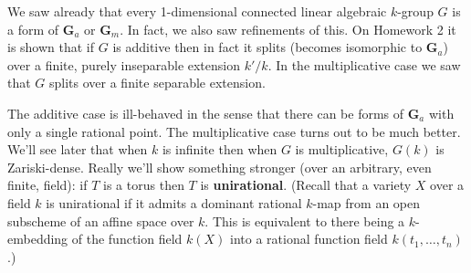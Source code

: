 \documentclass[10pt]{article}
\renewcommand{\(}{\left(}
\renewcommand{\)}{\right)}
\numberwithin{thm}{subsection}
\begin{document}
We saw already that every 1-dimensional connected linear algebraic $k$-group $G$ is a form of $\mathbf{G}_a$ or $\mathbf{G}_m$.
In fact, we also saw refinements of this. On Homework 2
it is shown that if $G$ is additive then in fact it splits
(becomes isomorphic to $\mathbf{G}_a$) over a finite, purely inseparable
extension $k'/k$.
In the multiplicative case we saw that $G$ splits over a finite separable extension.

The additive case is ill-behaved in the sense that there can be forms
of $\mathbf{G}_a$ with only a single rational point.
The multiplicative case turns out to be much better. We'll see later that
when $k$ is infinite then when $G$ is multiplicative, $G(k)$ is Zariski-dense.
Really we'll show something stronger (over an arbitrary, even finite, field):
if $T$ is a torus then $T$ is \textbf{unirational}.
(Recall that a variety $X$ over a field $k$ is unirational if it admits a dominant rational 
$k$-map from an open subscheme of an affine space over $k$.
This is equivalent to there being  a $k$-embedding of the function field $k(X)$
 into a rational function field $k(t_1,\ldots, t_n)$.)
\end{document}
